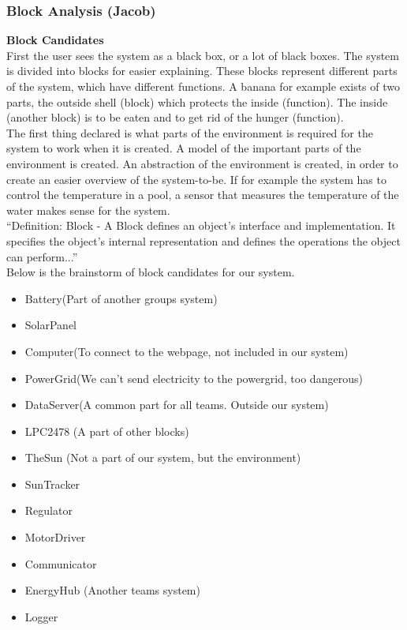 \documentclass[12pt,a4paper]{report}
\begin{document}
\subsubsection{Block Analysis (Jacob)}
\textbf{Block Candidates}\\

First the user sees the system as a black box, or a lot of black boxes. The system is divided into blocks for easier explaining. These blocks represent different parts of the system, which have different functions. A banana for example exists of two parts, the outside shell (block) which protects the inside (function). The inside (another block) is to be eaten and to get rid of the hunger (function).\\

The first thing declared is what parts of the environment is required for the system to work when it is created. A model of the important parts of the environment is created. An abstraction of the environment is created, in order to create an easier overview of the system-to-be. If for example the system has to control the temperature in a pool, a sensor that measures the temperature of the water makes sense for the system.\\

“Definition: Block - A Block defines an object's interface and implementation. It specifies the object's internal representation and defines the operations the object can perform...”\\

Below is the brainstorm of block candidates for our system.\\

\begin{itemize}
\item Battery(Part of another groups system)
\item SolarPanel
\item Computer(To connect to the webpage, not included in our system)
\item PowerGrid(We can’t send electricity to the powergrid, too dangerous)
\item DataServer(A common part for all teams. Outside our system)
\item LPC2478 (A part of other blocks)
\item TheSun (Not a part of our system, but the environment)
\item SunTracker
\item Regulator
\item MotorDriver
\item Communicator
\item EnergyHub (Another teams system)
\item Logger
\end{itemize}
\end{document}
